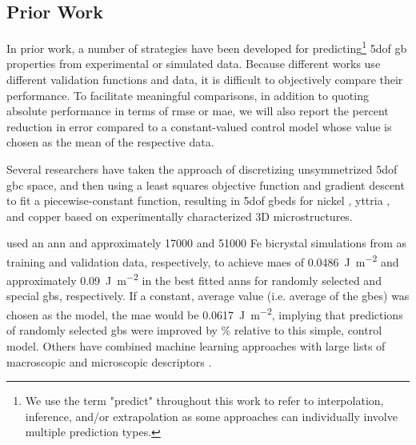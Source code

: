 \documentclass[final,twocolumn,12pt]{elsarticle}
\begin{document}
\subsection{Prior Work}
\label{sec:intro:prior}
 In prior work, a number of strategies have been developed for predicting\footnote{We use the term "predict" throughout this work to refer to interpolation, inference, and/or extrapolation as some approaches can individually involve multiple prediction types. } \gls{5dof} \gls{gb} properties from experimental or simulated data. Because different works use different validation functions and data, it is difficult to objectively compare their performance. To facilitate meaningful comparisons, in addition to quoting absolute performance in terms of \gls{rmse} or \gls{mae}, we will also report the percent reduction in error compared to a constant-valued control model whose value is chosen as the mean of the respective \inpt{} data.

Several researchers have taken the approach of discretizing unsymmetrized \gls{5dof} \gls{gbc} space, and then using a least squares objective function and gradient descent to fit a piecewise-constant function, resulting in \gls{5dof} \glspl{gbed} for nickel \cite{liRelativeGrainBoundary2009}, yttria \cite{dillonCharacterizationGrainboundaryCharacter2009}, and copper \cite{randleFiveparameterGrainBoundary2008} based on experimentally characterized 3D microstructures.

\citet{restrepoUsingArtificialNeural2014} used an \gls{ann} and approximately \num{17000} and \num{51000} Fe bicrystal simulations from \citet{kimIdentificationSchemeGrain2011} as training and validation data, respectively, to achieve \glspl{mae} of \SI{0.0486}{\J\per\square\meter} and approximately \SI{0.09}{\J\per\square\meter} in the best fitted \glspl{ann} for randomly selected and special \glspl{gb}, respectively. If a constant, average value (i.e. average of the \inpt{} \glspl{gbe}) was chosen as the model, the \gls{mae} would be \SI{0.0617}{\J\per\square\meter}, implying that predictions of randomly selected \glspl{gb} were improved by \% relative to this simple, control model. Others have combined machine learning approaches with large lists of macroscopic and microscopic descriptors \cite{guziewskiMicroscopicMacroscopicCharacterization2021,huGeneticAlgorithmguidedDeep2020}.
\end{document}
